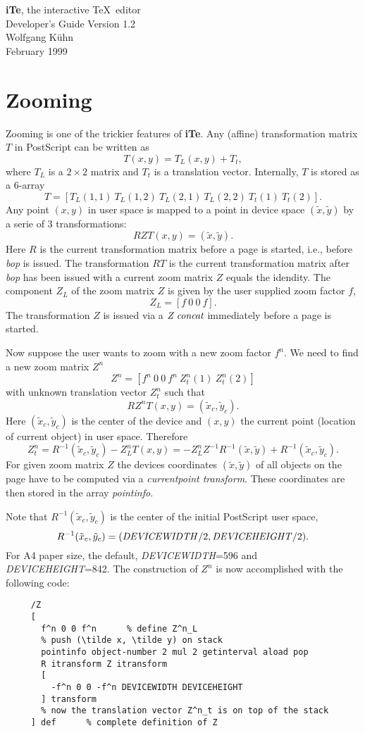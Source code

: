 \documentclass{article}
\newcommand{\iTe}{\textbf{\large iTe}}
\begin{document}
\begin{titlepage}
\begin{center}{\Large
\iTe, the interactive \TeX\ editor\\[6pt]
Developer's Guide Version 1.2\\[24pt]
Wolfgang K\"uhn\\[6pt]
February 1999}
\end{center}
\end{titlepage}


\section{Zooming}
Zooming is one of the trickier features of \iTe. Any (affine)
transformation matrix $T$ in PostScript can be written as
\[
T(x, y) = T_L (x, y)+ T_t,
\]
where $T_L$ is a $2\times 2$ matrix and $T_t$ is a translation vector.
Internally, $T$ is stored as a $6$-array
\[
T=[T_L(1,1)\ T_L(1,2)\ T_L(2,1)\ T_L(2,2)\ T_t(1)\ T_t(2)].
\]
Any point $(x, y)$ in user space is mapped to a point in device space
$(\tilde x, \tilde y)$ by a serie of 3 transformations:
\[
RZT(x, y)=(\tilde x, \tilde y).
\]
Here $R$ is the current transformation matrix before a page is
started, i.e., before \emph{bop} is issued. The transformation $RT$ is
the current transformation matrix after \emph{bop} has been issued
with a current zoom matrix $Z$ equals the idendity. The component
$Z_L$ of the zoom matrix $Z$ is given by the user supplied zoom factor
$f$, 
\[
Z_L=[f\ 0\ 0\ f].
\]
The transformation $Z$ is issued via a $\emph{Z concat}$ immediately
before a page is started.

Now suppose the user wants to zoom with a new zoom factor $f^n$.
We need to find a new zoom matrix $Z^n$
\[
Z^n=[f^n\ 0\ 0\ f^n\ Z^n_t(1)\ Z^n_t(2)]
\]
with unknown translation vector $Z^n_t$ such that
\[
RZ^nT(x, y)=(\tilde x_c, \tilde y_c).
\]
Here $(\tilde x_c, \tilde y_c)$ is the center of the device and
$(x,y)$ the current point (location of current object) in user space.
Therefore
\[
Z^n_t=R^{-1}(\tilde x_c, \tilde y_c)-Z^n_L T(x,y)
     =-Z^n_L Z^{-1}R^{-1}(\tilde x, \tilde y)
      +R^{-1}(\tilde x_c, \tilde y_c).
\]
For given zoom matrix $Z$ the devices coordinates $(\tilde x, \tilde y)$ of
all objects on the page have to be computed via a \emph{currentpoint transform}.
These coordinates are then stored in the array \emph{pointinfo}.

Note that $R^{-1}(\tilde x_c, \tilde y_c)$ is the center of the initial
PostScript user space,
\[
R^{-1}(\tilde x_c, \tilde y_c) = (\textrm{\emph{DEVICEWIDTH}}/2, 
                                  \textrm{\emph{DEVICEHEIGHT}}/2).
\]
For A4 paper size, the default, \emph{DEVICEWIDTH}=596 and \emph{DEVICEHEIGHT}=842.
The construction of $Z^n$ is now accomplished with the following code:
\begin{verbatim}
     /Z 
     [ 
       f^n 0 0 f^n      % define Z^n_L
       % push (\tilde x, \tilde y) on stack     
       pointinfo object-number 2 mul 2 getinterval aload pop 
       R itransform Z itransform
       [
         -f^n 0 0 -f^n DEVICEWIDTH DEVICEHEIGHT
       ] transform
       % now the translation vector Z^n_t is on top of the stack
     ] def      % complete definition of Z
\end{verbatim}
\end{document}
